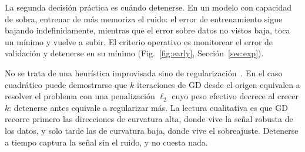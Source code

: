 La segunda decisión práctica es cuándo detenerse. En un modelo con capacidad de sobra, entrenar de más memoriza el ruido: el error de entrenamiento sigue bajando indefinidamente, mientras que el error sobre datos no vistos baja, toca un mínimo y vuelve a subir. El criterio operativo es monitorear el error de validación y detenerse en su mínimo (Fig.~\ref{fig:early}, Sección~\ref{sec:exp}).

No se trata de una heurística improvisada sino de regularización~\cite{prechelt1998}. En el caso cuadrático puede demostrarse que $k$ iteraciones de GD desde el origen equivalen a resolver el problema con una penalización $\ell_2$ cuyo peso efectivo decrece al crecer $k$: detenerse antes equivale a regularizar más. La lectura cualitativa es que GD recorre primero las direcciones de curvatura alta, donde vive la señal robusta de los datos, y solo tarde las de curvatura baja, donde vive el sobreajuste. Detenerse a tiempo captura la señal sin el ruido, y no cuesta nada.
